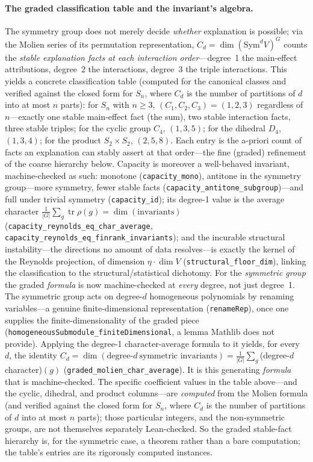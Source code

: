 \documentclass[11pt,a4paper]{article}
\begin{document}
\paragraph{The graded classification table and the invariant's algebra.}
The symmetry group does not merely decide \emph{whether} explanation is possible; via
the Molien series of its permutation representation, $C_d = \dim(\mathrm{Sym}^d V)^G$
counts the \emph{stable explanation facts at each interaction order}---degree~1 the
main-effect attributions, degree~2 the interactions, degree~3 the triple interactions.
This yields a concrete classification table (computed for the canonical classes and
verified against the closed form for $S_n$, where $C_d$ is the number of partitions of
$d$ into at most $n$ parts): for $S_n$ with $n \geq 3$, $(C_1,C_2,C_3) = (1,2,3)$
regardless of $n$---exactly one stable main-effect fact (the sum), two stable interaction
facts, three stable triples; for the cyclic group $C_4$, $(1,3,5)$; for the dihedral
$D_4$, $(1,3,4)$; for the product $S_2 \times S_2$, $(2,5,8)$. Each entry is the a-priori
count of facts an explanation can stably assert at that order---the fine (graded)
refinement of the coarse hierarchy below. Capacity is moreover a well-behaved invariant,
machine-checked as such: monotone (\texttt{capacity\_mono}), antitone in the symmetry
group---more symmetry, fewer stable facts (\texttt{capacity\_antitone\_subgroup})---and
full under trivial symmetry (\texttt{capacity\_id}); its degree-1 value is the average
character $\tfrac{1}{|G|}\sum_g \operatorname{tr}\rho(g) = \dim(\text{invariants})$
(\texttt{capacity\_reynolds\_eq\_char\_average}, \texttt{capacity\_reynolds\_eq\_finrank\_invariants});
and the incurable structural instability---the directions no amount of data
resolves---is exactly the kernel of the Reynolds projection, of dimension $\eta\cdot\dim V$
(\texttt{structural\_floor\_dim}), linking the classification to the structural/statistical
dichotomy. For the \emph{symmetric group} the graded \emph{formula} is now machine-checked at
\emph{every} degree, not just degree~1. The symmetric group acts on degree-$d$ homogeneous
polynomials by renaming variables---a genuine finite-dimensional representation (\texttt{renameRep}),
once one supplies the finite-dimensionality of the graded piece
(\texttt{homogeneousSubmodule\_finiteDimensional}, a lemma Mathlib does not provide). Applying the
degree-1 character-average formula to it yields, for every~$d$, the identity
$C_d = \dim(\text{degree-}d\ \text{symmetric invariants}) = \tfrac{1}{|G|}\sum_g$(degree-$d$
character)$(g)$ (\texttt{graded\_molien\_char\_average}). It is this generating \emph{formula} that
is machine-checked. The specific coefficient values in the table above---and the cyclic, dihedral,
and product columns---are \emph{computed} from the Molien formula (and verified against the closed
form for $S_n$, where $C_d$ is the number of partitions of $d$ into at most $n$ parts); those
particular integers, and the non-symmetric groups, are not themselves separately Lean-checked. So
the graded stable-fact hierarchy is, for the symmetric case, a theorem rather than a bare
computation; the table's entries are its rigorously computed instances.
\end{document}
